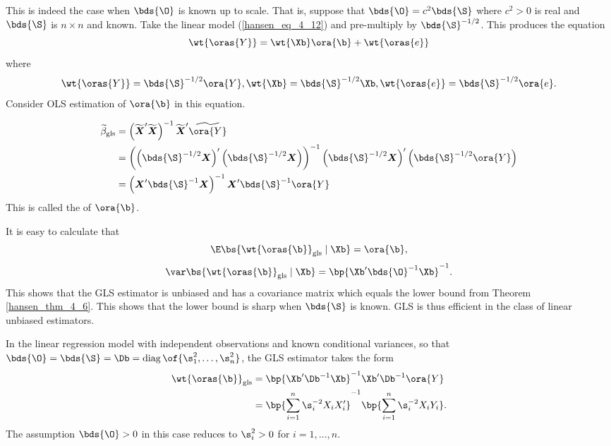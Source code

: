 This is indeed the case when $\bds{\O}$ is known up to scale. That is, suppose that $\bds{\O} = c^2 \bds{\S}$ where $c^2 > 0$ is real and $\bds{\S}$ is $n \times n$ and known. Take the linear model (\ref{hansen_eq_4_12}) and pre-multiply by $\bds{\S}^{-1/2}$. This produces the equation 
$$\wt{\oras{Y}} = \wt{\Xb}\ora{\b} + \wt{\oras{e}}$$
where 
$$\wt{\oras{Y}} = \bds{\S}^{-1/2} \ora{Y}, \wt{\Xb} = \bds{\S}^{-1/2} \Xb, \wt{\oras{e}} = \bds{\S}^{-1/2} \ora{e}.$$
Consider OLS estimation of $\ora{\b}$ in this equation.

\begin{equation}
    \label{4.17}
    \begin{aligned}
        \widetilde{\beta}_{\mathrm{gls}} & =\left(\widetilde{\boldsymbol{X}}^{\prime} \widetilde{\boldsymbol{X}}\right)^{-1} \widetilde{\boldsymbol{X}}^{\prime} \widetilde{\ora{Y}} \\
        & =\left(\left(\bds{\S}^{-1 / 2} \boldsymbol{X}\right)^{\prime}\left(\bds{\S}^{-1 / 2} \boldsymbol{X}\right)\right)^{-1}\left(\bds{\S}^{-1 / 2} \boldsymbol{X}\right)^{\prime}\left(\bds{\S}^{-1 / 2} \ora{Y}\right) \\
        & =\left(\boldsymbol{X}^{\prime} \bds{\S}^{-1} \boldsymbol{X}\right)^{-1} \boldsymbol{X}^{\prime} \bds{\S}^{-1} \ora{Y}
    \end{aligned}
\end{equation}
This is called the  of $\ora{\b}$.

It is easy to calculate that 
\begin{equation}
    \label{hansen_eq_4_18}
    \E\bs{\wt{\oras{\b}}_{\text{gls}} \mid \Xb}= \ora{\b},
\end{equation}
\begin{equation}
    \label{hansen_eq_4_19}
    \var\bs{\wt{\oras{\b}}_{\text{gls}} \mid \Xb} = \bp{\Xb^\prime \bds{\O}^{-1} \Xb}^{-1}.
\end{equation}
This shows that the GLS estimator is unbiased and has a covariance matrix which equals the lower bound from Theorem \ref{hansen_thm_4_6}. This shows that the lower bound is sharp when $\bds{\S}$ is known. GLS is thus efficient in the class of linear unbiased estimators.

In the linear regression model with independent observations and known conditional variances, so that $\bds{\O} = \bds{\S} = \Db = \operatorname{diag}\of{\s_1^2, \ldots, \s_n^2}$, the GLS estimator takes the form
\begin{equation}
    \notag
    \begin{aligned}
        \wt{\oras{\b}}_{\text{gls}} & = \bp{\Xb^\prime \Db^{-1} \Xb}^{-1} \Xb^\prime \Db^{-1} \ora{Y} \\
        & = \bp{\sum_{i=1}^n \s_i^{-2} X_i X_i^\prime}^{-1} \bp{\sum_{i=1}^n \s_i^{-2} X_i Y_i}.
    \end{aligned}
\end{equation}
The assumption $\bds{\O} > 0$ in this case reduces to $\s_i^2 > 0$ for $i=1, \ldots, n$.

